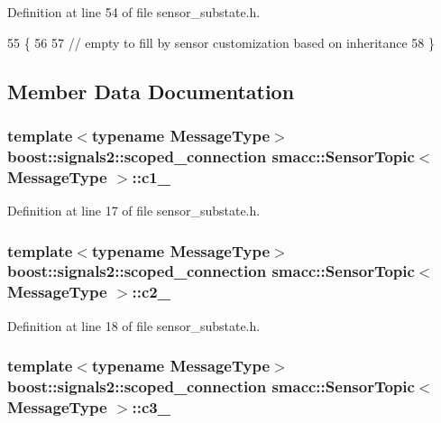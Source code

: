Definition at line 54 of file sensor\+\_\+substate.\+h.


\begin{DoxyCode}
55   \{
56 
57     \textcolor{comment}{// empty to fill by sensor customization based on inheritance}
58   \}
\end{DoxyCode}


\subsection{Member Data Documentation}
\subsubsection[{\texorpdfstring{c1\+\_\+}{c1_}}]{\setlength{\rightskip}{0pt plus 5cm}template$<$typename Message\+Type$>$ boost\+::signals2\+::scoped\+\_\+connection {\bf smacc\+::\+Sensor\+Topic}$<$ Message\+Type $>$\+::c1\+\_\+}\hypertarget{classsmacc_1_1SensorTopic_a3c27b66b1bd8bc850875d95ad5a41041}{}\label{classsmacc_1_1SensorTopic_a3c27b66b1bd8bc850875d95ad5a41041}


Definition at line 17 of file sensor\+\_\+substate.\+h.

\subsubsection[{\texorpdfstring{c2\+\_\+}{c2_}}]{\setlength{\rightskip}{0pt plus 5cm}template$<$typename Message\+Type$>$ boost\+::signals2\+::scoped\+\_\+connection {\bf smacc\+::\+Sensor\+Topic}$<$ Message\+Type $>$\+::c2\+\_\+}\hypertarget{classsmacc_1_1SensorTopic_a7d93fd46086bf098cf75a12c27976a8e}{}\label{classsmacc_1_1SensorTopic_a7d93fd46086bf098cf75a12c27976a8e}


Definition at line 18 of file sensor\+\_\+substate.\+h.

\subsubsection[{\texorpdfstring{c3\+\_\+}{c3_}}]{\setlength{\rightskip}{0pt plus 5cm}template$<$typename Message\+Type$>$ boost\+::signals2\+::scoped\+\_\+connection {\bf smacc\+::\+Sensor\+Topic}$<$ Message\+Type $>$\+::c3\+\_\+}\hypertarget{classsmacc_1_1SensorTopic_a2e54533c2a0e0daec10eec3f69ff63d6}{}\label{classsmacc_1_1SensorTopic_a2e54533c2a0e0daec10eec3f69ff63d6}


